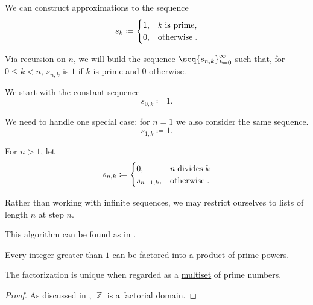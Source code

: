 \begin{algorithm}\label{alg:sieve_of_eratosthenes}
  We can construct approximations to the sequence
  \begin{equation*}
    s_k \coloneqq \begin{cases}
      1, &k \T{is prime}, \\
      0, &\T{otherwise}.
    \end{cases}
  \end{equation*}

  Via recursion on \( n \), we will build the sequence \( \seq{ s_{n,k} }_{k=0}^\infty \) such that, for \( 0 \leq k < n \), \( s_{n,k} \) is \( 1 \) if \( k \) is prime and \( 0 \) otherwise.

  \begin{thmenum}
     We start with the constant sequence
    \begin{equation*}
      s_{0,k} \coloneqq 1.
    \end{equation*}

     We need to handle one special case: for \( n = 1 \) we also consider the same sequence.
    \begin{equation*}
      s_{1,k} \coloneqq 1.
    \end{equation*}

     For \( n > 1 \), let
    \begin{equation*}
      s_{n,k} \coloneqq \begin{cases}
        0,         &n \T{divides} k \\
        s_{n-1,k}, &\T{otherwise}.
      \end{cases}
    \end{equation*}
  \end{thmenum}
\end{algorithm}
\begin{comments}
  \item Rather than working with infinite sequences, we may restrict ourselves to lists of length \( n \) at step \( n \).
  \item This algorithm can be found as  in \cite{code}.
\end{comments}

\begin{theorem}\label{thm:fundamental_theorem_of_arithmetic}
  Every integer greater than \( 1 \) can be \hyperref[def:irreducible_factorization]{factored} into a product of \hyperref[def:prime_number]{prime} powers.
\end{theorem}
\begin{comments}
  \item The factorization is unique when regarded as a \hyperref[def:multiset]{multiset} of prime numbers.
\end{comments}
\begin{proof}
  As discussed in , \( \BbbZ \) is a factorial domain.
\end{proof}

